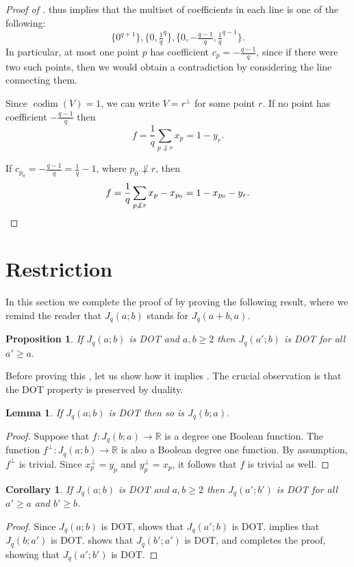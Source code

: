 \documentclass{article}
\newtheorem{proposition}[theorem]{Proposition}
\newtheorem{lemma}[theorem]{Lemma}
\newtheorem{corollary}[theorem]{Corollary}
\theoremstyle{definition}
\providecommand{\RR}{\mathbb{R}}
\DeclareMathOperator{\codim}{codim}
\begin{document}
\begin{proof}[Proof of ]
 thus implies that the multiset of coefficients in each line is one of the following:
\[
 \{0^{q+1}\}, \{0,\tfrac{1}{q}^q\}, \{0,-\tfrac{q-1}{q},\tfrac{1}{q}^{q-1}\}.
\]
In particular, at most one point $p$ has coefficient $c_p = -\frac{q-1}{q}$, since if there were two such points, then we would obtain a contradiction by considering the line connecting them.

Since $\codim(V) = 1$, we can write $V = r^\perp$ for some point $r$. If no point has coefficient $-\frac{q-1}{q}$ then
\[
 f = \frac{1}{q} \sum_{p \not\perp r} x_p = 1 - y_r.
\]

If $c_{p_0} = -\frac{q-1}{q}=\frac1q-1$, where $p_0 \not\perp r$, then
\[
 f = \frac{1}{q} \sum_{p \not\perp r} x_p - x_{p_0} = 1 - x_{p_0} - y_r. \qedhere
\]
\end{proof}

\section{Restriction}
\label{sec:restriction}

In this section we complete the proof of  by proving the following result, where we remind the reader that $J_q(a;b)$ stands for $J_q(a+b,a)$.

\begin{proposition} \label{pro:step3}
If $J_q(a;b)$ is DOT and $a,b \ge 2$ then $J_q(a';b)$ is DOT for all $a' \ge a$.    
\end{proposition}

Before proving this , let us show how it implies . The crucial observation is that the DOT property is preserved by duality.

\begin{lemma} \label{lem:DOT-duality}
If $J_q(a;b)$ is DOT then so is $J_q(b;a)$.
\end{lemma}
\begin{proof}
Suppose that $f\colon J_q(b;a) \to \RR$ is a degree one Boolean function. The function $f^\perp\colon J_q(a;b) \to \RR$ is also a Boolean degree one function. By assumption, $f^\perp$ is trivial. Since $x_p^\perp = y_p$ and $y_p^\perp = x_p$, it follows that $f$ is trivial as well.
\end{proof}

\begin{corollary} \label{cor:step3}
If $J_q(a;b)$ is DOT and $a,b \ge 2$ then $J_q(a';b')$ is DOT for all $a' \ge a$ and $b' \geq b$.
\end{corollary}
\begin{proof}
Since $J_q(a;b)$ is DOT,  shows that $J_q(a';b)$ is DOT.  implies that $J_q(b;a')$ is DOT.  shows that $J_q(b';a')$ is DOT, and  completes the proof, showing that $J_q(a';b')$ is DOT.
\end{proof}
\end{document}
